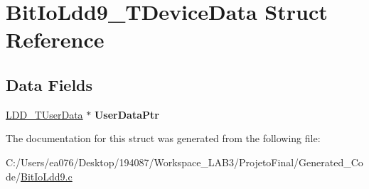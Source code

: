 \hypertarget{struct_bit_io_ldd9___t_device_data}{\section{Bit\-Io\-Ldd9\-\_\-\-T\-Device\-Data Struct Reference}
\label{struct_bit_io_ldd9___t_device_data}
}
\subsection*{Data Fields}
\begin{DoxyCompactItemize}
\item 
\hypertarget{struct_bit_io_ldd9___t_device_data_aa1b94a2eadbba8a7ac379b9d8da04107}{\hyperlink{group___p_e___types__module_ga0b66a73f87238a782318aa0be7578e35}{L\-D\-D\-\_\-\-T\-User\-Data} $\ast$ {\bfseries User\-Data\-Ptr}}\label{struct_bit_io_ldd9___t_device_data_aa1b94a2eadbba8a7ac379b9d8da04107}

\end{DoxyCompactItemize}


The documentation for this struct was generated from the following file\-:\begin{DoxyCompactItemize}
\item 
C\-:/\-Users/ea076/\-Desktop/194087/\-Workspace\-\_\-\-L\-A\-B3/\-Projeto\-Final/\-Generated\-\_\-\-Code/\hyperlink{_bit_io_ldd9_8c}{Bit\-Io\-Ldd9.\-c}\end{DoxyCompactItemize}

